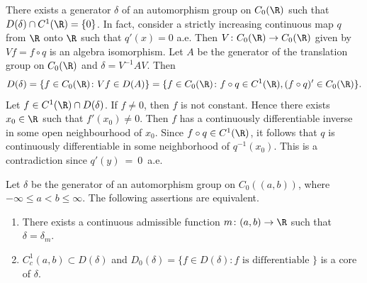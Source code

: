 \begin{example}\label{ex:b2-3.22}
%
There exists a generator $\delta$ of an automorphism group on $C_{0}(\R)$ such that $D(\delta) \cap C^{1}(\R) = \{0\}$.
In fact, consider a strictly increasing continuous map $q$ from $\R$ onto $\R$ such that
$q'(x) = 0$ a.e.
Then $V \colon C_{0}(\R) \to C_{0}(\R)$ given by $Vf = f \circ q$ is an algebra isomorphism.
Let $A$ be the generator of the translation group on $C_{0}(\R)$ and $\delta = V^{-1}AV$.
Then 
\[
D(\delta) = \{ f \in C_{0}(\R) \colon Vf \in D(A)\} = \{f \in C_{0}(\R) \colon f \circ q \in C^{1}(\R), (f \circ q)' \in C_{0}(\R) \}.
\]
Let $f \in C^{1}(\R) \cap D(\delta)$.
If\/ $f \neq 0$, then $f$ is not constant.
Hence there exists $x_{0} \in \R$ such that $f'(x_{0}) \neq 0$.
Then $f$ has a continuously differentiable inverse in some open neighbourhood of\/ $x_{0}$.
Since $f \circ q \in C^{1}(\R)$, it follows that $q$ is continuously differentiable in some neighborhood of\/ $q^{-1}(x_{0})$.
This is a contradiction since $q'(y)~=~0$~a.e.
\end{example}
\begin{theorem}\label{thm:b2-3.23}
%
Let $\delta$ be the generator of an automorphism group on $C_{0}((a,b))$, where $-\infty \leq a < b \leq \infty$.
The following assertions are equivalent.
\begin{enumerate}[\upshape (a)]
\item \label{thm:b2-3.23-1} 
There exists a continuous admissible function $m \colon (a,b) \to \R$ such that $\delta = \delta_{m}$.
\item \label{thm:b2-3.23-2}
$C_{c}^{1}(a,b) \subset D(\delta)$ and $D_{0}(\delta) = \{ f \in D(\delta) \colon f \text{ is differentiable } \}$ is a core of\/ $\delta$.
\end{enumerate}
\end{theorem}
